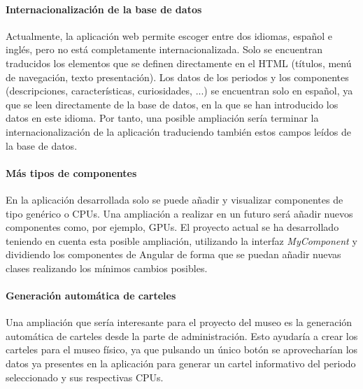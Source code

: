 \paragraph*{Internacionalización de la base de datos}
Actualmente, la aplicación web permite escoger entre dos idiomas, español e inglés, pero no está completamente internacionalizada. Solo se encuentran traducidos los elementos que se definen directamente en el HTML (títulos, menú de navegación, texto presentación). Los datos de los periodos y los componentes (descripciones, características, curiosidades, ...) se encuentran solo en español, ya que se leen directamente de la base de datos, en la que se han introducido los datos en este idioma. Por tanto, una posible ampliación sería terminar la internacionalización de la aplicación traduciendo también estos campos leídos de la base de datos.

\paragraph*{Más tipos de componentes}
En la aplicación desarrollada solo se puede añadir y visualizar componentes de tipo genérico o CPUs. Una ampliación a realizar en un futuro será añadir nuevos componentes como, por ejemplo, GPUs. El proyecto actual se ha desarrollado teniendo en cuenta esta posible ampliación, utilizando la interfaz \textit{MyComponent} y dividiendo los componentes de Angular de forma que se puedan añadir nuevas clases realizando los mínimos cambios posibles.

\paragraph*{Generación automática de carteles}
Una ampliación que sería interesante para el proyecto del museo es la generación automática de carteles desde la parte de administración. Esto ayudaría a crear los carteles para el museo físico, ya que pulsando un único botón se aprovecharían los datos ya presentes en la aplicación para generar un cartel informativo del periodo seleccionado y sus respectivas CPUs.


% 
%
